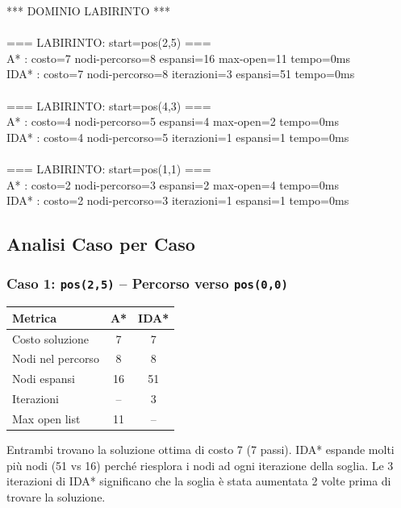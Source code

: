 \documentclass[12pt,a4paper]{article}
\begin{document}
\begin{tcolorbox}[colback=black!90, coltext=green!80, fontupper=\ttfamily\small, title=Output]
*** DOMINIO LABIRINTO ***\\
\\
=== LABIRINTO: start=pos(2,5) ===\\
A*   : costo=7  nodi-percorso=8  espansi=16  max-open=11  tempo=0ms\\
IDA* : costo=7  nodi-percorso=8  iterazioni=3  espansi=51  tempo=0ms\\
\\
=== LABIRINTO: start=pos(4,3) ===\\
A*   : costo=4  nodi-percorso=5  espansi=4  max-open=2  tempo=0ms\\
IDA* : costo=4  nodi-percorso=5  iterazioni=1  espansi=1  tempo=0ms\\
\\
=== LABIRINTO: start=pos(1,1) ===\\
A*   : costo=2  nodi-percorso=3  espansi=2  max-open=4  tempo=0ms\\
IDA* : costo=2  nodi-percorso=3  iterazioni=1  espansi=1  tempo=0ms
\end{tcolorbox}

\subsection{Analisi Caso per Caso}

\subsubsection{Caso 1: \texttt{pos(2,5)} -- Percorso verso \texttt{pos(0,0)}}

\begin{center}
\renewcommand{\arraystretch}{1.2}
\begin{tabular}{lcc}
\toprule
\textbf{Metrica} & \textbf{A*} & \textbf{IDA*} \\
\midrule
Costo soluzione & 7 & 7 \\
Nodi nel percorso & 8 & 8 \\
Nodi espansi & 16 & 51 \\
Iterazioni & -- & 3 \\
Max open list & 11 & -- \\
\bottomrule
\end{tabular}
\end{center}

Entrambi trovano la soluzione ottima di costo 7 (7 passi). IDA* espande molti
più nodi (51 vs 16) perché riesplora i nodi ad ogni iterazione della soglia.
Le 3 iterazioni di IDA* significano che la soglia è stata aumentata 2 volte
prima di trovare la soluzione.
\end{document}
